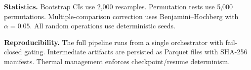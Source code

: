 \documentclass{article}
\begin{document}
\textbf{Statistics.}  Bootstrap CIs use 2{,}000 resamples.  Permutation tests use 5{,}000 permutations.  Multiple-comparison correction uses Benjamini--Hochberg with $\alpha = 0.05$.  All random operations use deterministic seeds.

\textbf{Reproducibility.}  The full pipeline runs from a single orchestrator with fail-closed gating.  Intermediate artifacts are persisted as Parquet files with SHA-256 manifests.  Thermal management enforces checkpoint/resume determinism.
\end{document}
